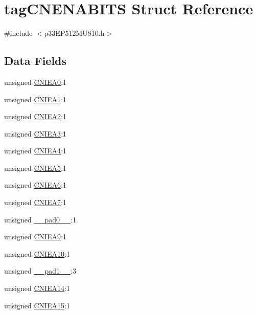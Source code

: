 \hypertarget{structtag_c_n_e_n_a_b_i_t_s}{}\section{tag\+C\+N\+E\+N\+A\+B\+I\+TS Struct Reference}
\label{structtag_c_n_e_n_a_b_i_t_s}


{\ttfamily \#include $<$p33\+E\+P512\+M\+U810.\+h$>$}

\subsection*{Data Fields}
\begin{DoxyCompactItemize}
\item 
unsigned \hyperlink{structtag_c_n_e_n_a_b_i_t_s_a3a71afad507ee7d3bad310db8bb86d59}{C\+N\+I\+E\+A0}\+:1
\item 
unsigned \hyperlink{structtag_c_n_e_n_a_b_i_t_s_accc984605f5ede03f98d9c41ceb70665}{C\+N\+I\+E\+A1}\+:1
\item 
unsigned \hyperlink{structtag_c_n_e_n_a_b_i_t_s_ad89cbe7188be9b420c4337ab47b8ff12}{C\+N\+I\+E\+A2}\+:1
\item 
unsigned \hyperlink{structtag_c_n_e_n_a_b_i_t_s_a131e80d4b5f6d58e0ac4690140389e1c}{C\+N\+I\+E\+A3}\+:1
\item 
unsigned \hyperlink{structtag_c_n_e_n_a_b_i_t_s_a76ce772791063097073ed30acc17da3f}{C\+N\+I\+E\+A4}\+:1
\item 
unsigned \hyperlink{structtag_c_n_e_n_a_b_i_t_s_a71954bfef6a1ff035430fe7689b473cd}{C\+N\+I\+E\+A5}\+:1
\item 
unsigned \hyperlink{structtag_c_n_e_n_a_b_i_t_s_aae027ec84012ee54c73510622e4f47a5}{C\+N\+I\+E\+A6}\+:1
\item 
unsigned \hyperlink{structtag_c_n_e_n_a_b_i_t_s_aba977c82c627ffb3ca919918328db184}{C\+N\+I\+E\+A7}\+:1
\item 
unsigned \hyperlink{structtag_c_n_e_n_a_b_i_t_s_adf71f3d8410c1f1dbbc96680a92c49af}{\+\_\+\+\_\+pad0\+\_\+\+\_\+}\+:1
\item 
unsigned \hyperlink{structtag_c_n_e_n_a_b_i_t_s_a093cbe224a5d505224829a0e1467c9a1}{C\+N\+I\+E\+A9}\+:1
\item 
unsigned \hyperlink{structtag_c_n_e_n_a_b_i_t_s_a8572e14353f0a7f686d0c45ca1513a4a}{C\+N\+I\+E\+A10}\+:1
\item 
unsigned \hyperlink{structtag_c_n_e_n_a_b_i_t_s_acaf2d0924a107ec6e8d2e31febaf66f9}{\+\_\+\+\_\+pad1\+\_\+\+\_\+}\+:3
\item 
unsigned \hyperlink{structtag_c_n_e_n_a_b_i_t_s_aed378ba80f874aefa3467eda25e24a20}{C\+N\+I\+E\+A14}\+:1
\item 
unsigned \hyperlink{structtag_c_n_e_n_a_b_i_t_s_a61bdba26cc586cb43f46132b98281111}{C\+N\+I\+E\+A15}\+:1
\end{DoxyCompactItemize}


